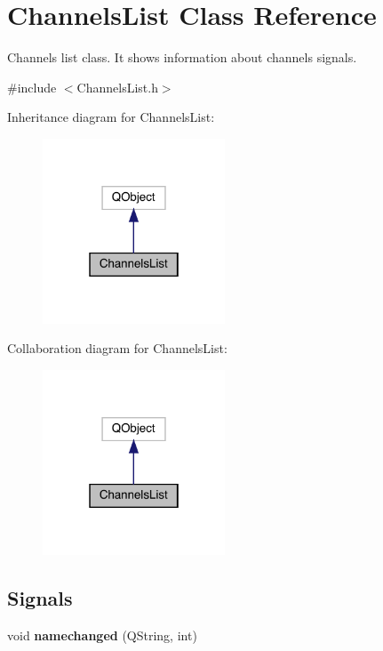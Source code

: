 \hypertarget{class_channels_list}{}\section{Channels\+List Class Reference}
\label{class_channels_list}


Channels list class. It shows information about channels signals.  




{\ttfamily \#include $<$Channels\+List.\+h$>$}



Inheritance diagram for Channels\+List\+:
\nopagebreak
\begin{figure}[H]
\begin{center}
\leavevmode
\includegraphics[width=154pt]{class_channels_list__inherit__graph}
\end{center}
\end{figure}


Collaboration diagram for Channels\+List\+:
\nopagebreak
\begin{figure}[H]
\begin{center}
\leavevmode
\includegraphics[width=154pt]{class_channels_list__coll__graph}
\end{center}
\end{figure}
\subsection*{Signals}
\begin{DoxyCompactItemize}
\item 
\mbox{\label{class_channels_list_a78d7e060309b406ad27f4abf148e76d0}} 
void {\bfseries namechanged} (Q\+String, int)
\end{DoxyCompactItemize}
